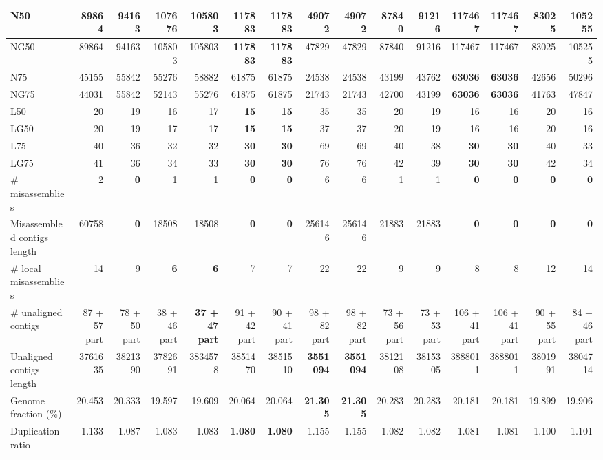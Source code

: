 \documentclass[12pt,a4paper]{article}
\begin{document}
\begin{table}[ht]
\begin{center}
\begin{tabular}{|l*{14}{|r}|}
N50 & 89864 & 94163 & 107676 & 105803 & {\bf 117883} & {\bf 117883} & 49072 & 49072 & 87840 & 91216 & 117467 & 117467 & 83025 & 105255 \\ \hline
NG50 & 89864 & 94163 & 105803 & 105803 & {\bf 117883} & {\bf 117883} & 47829 & 47829 & 87840 & 91216 & 117467 & 117467 & 83025 & 105255 \\ \hline
N75 & 45155 & 55842 & 55276 & 58882 & 61875 & 61875 & 24538 & 24538 & 43199 & 43762 & {\bf 63036} & {\bf 63036} & 42656 & 50296 \\ \hline
NG75 & 44031 & 55842 & 52143 & 55276 & 61875 & 61875 & 21743 & 21743 & 42700 & 43199 & {\bf 63036} & {\bf 63036} & 41763 & 47847 \\ \hline
L50 & 20 & 19 & 16 & 17 & {\bf 15} & {\bf 15} & 35 & 35 & 20 & 19 & 16 & 16 & 20 & 16 \\ \hline
LG50 & 20 & 19 & 17 & 17 & {\bf 15} & {\bf 15} & 37 & 37 & 20 & 19 & 16 & 16 & 20 & 16 \\ \hline
L75 & 40 & 36 & 32 & 32 & {\bf 30} & {\bf 30} & 69 & 69 & 40 & 38 & {\bf 30} & {\bf 30} & 40 & 33 \\ \hline
LG75 & 41 & 36 & 34 & 33 & {\bf 30} & {\bf 30} & 76 & 76 & 42 & 39 & {\bf 30} & {\bf 30} & 42 & 34 \\ \hline
\# misassemblies & 2 & {\bf 0} & 1 & 1 & {\bf 0} & {\bf 0} & 6 & 6 & 1 & 1 & {\bf 0} & {\bf 0} & {\bf 0} & {\bf 0} \\ \hline
Misassembled contigs length & 60758 & {\bf 0} & 18508 & 18508 & {\bf 0} & {\bf 0} & 256146 & 256146 & 21883 & 21883 & {\bf 0} & {\bf 0} & {\bf 0} & {\bf 0} \\ \hline
\# local misassemblies & 14 & 9 & {\bf 6} & {\bf 6} & 7 & 7 & 22 & 22 & 9 & 9 & 8 & 8 & 12 & 14 \\ \hline
\# unaligned contigs & 87 + 57 part & 78 + 50 part & 38 + 46 part & {\bf 37 + 47 part} & 91 + 42 part & 90 + 41 part & 98 + 82 part & 98 + 82 part & 73 + 56 part & 73 + 53 part & 106 + 41 part & 106 + 41 part & 90 + 55 part & 84 + 46 part \\ \hline
Unaligned contigs length & 3761635 & 3821390 & 3782691 & 3834578 & 3851470 & 3851510 & {\bf 3551094} & {\bf 3551094} & 3812108 & 3815305 & 3888011 & 3888011 & 3801991 & 3804714 \\ \hline
Genome fraction (\%) & 20.453 & 20.333 & 19.597 & 19.609 & 20.064 & 20.064 & {\bf 21.305} & {\bf 21.305} & 20.283 & 20.283 & 20.181 & 20.181 & 19.899 & 19.906 \\ \hline
Duplication ratio & 1.133 & 1.087 & 1.083 & 1.083 & {\bf 1.080} & {\bf 1.080} & 1.155 & 1.155 & 1.082 & 1.082 & 1.081 & 1.081 & 1.100 & 1.101 \\ \hline

\end{tabular}
\end{center}
\end{table}
\end{document}
